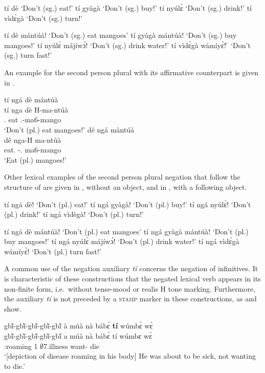 \ea\label{NEGIMPSG}
\ea  tí dè `Don't (sg.) eat!'
\ex tí gyàgà `Don't (sg.) buy!'
\ex tí nyúlɛ̀ `Don't (sg.) drink!' 
\ex tí vìdɛ̀gà `Don't (sg.) turn!' 
\z
\z

\ea\label{NEGIMPSGOBJ}
\ea  tí dè mántúà!  `Don't (sg.) eat mangoes'
\ex tí gyàgà mántúà!  `Don't (sg.) buy mangoes!'
\ex tí nyúlɛ̀ májíwɔ́!  `Don't (sg.) drink water!'
\ex tí vìdɛ̀gà wámíyɛ̀! ̀ `Don't (sg.) turn fast!' 
\z
\z

An example for the second person plural with its affirmative counterpart is given in .

\ea\label{ti4}
\ea \label{ti4a}
  \glll   tí ngá dè mántúà \\
          tí nga dè H-ma-ntúà  \\
         {\NEG}.{\R} {\PL} eat {\OBJ}.{\LINK}-ma6-mango\\
    \trans `Don't (pl.) eat mangoes!'
\ex\label{ti4b}
  \glll   dê ngá màntúà \\
          dê nga-H ma-ntúà  \\
         eat.{\IMP} {\PL}-{\OBJ}.{\LINK} ma6-mango\\
    \trans `Eat (pl.) mangoes!'
\z
\z

Other lexical examples of the second person plural negation that follow the structure of  are given in , without an object, and in , with a following object.


\ea\label{NEGIMPPL}
\ea  tí ngá dè! `Don't (pl.) eat!'
\ex tí ngá gyàgà! `Don't (pl.) buy!'
\ex tí ngá nyúlɛ̀! `Don't (pl.) drink!' 
\ex tí ngá vìdègà! `Don't (pl.) turn!' 
\z
\z


\ea\label{NEGIMPPLOBJ}
\ea  tí ngá dè mántúà!  `Don't (pl.) eat mangoes'
\ex tí ngá gyàgà mántúà!  `Don't (pl.) buy mangoes!'
\ex tí ngá nyúlɛ̀ májíwɔ́!  `Don't (pl.) drink water!'
\ex tí ngá vìdɛ̀gà wámíyɛ̀!  `Don't (pl.) turn fast!' 
\z
\z









A common use of the negation auxiliary {\itshape tí} concerns the negation of infinitives. It is characteristic of these constructions that the negated lexical verb appears in its non-finite form, i.e.\ without tense-mood or realis H tone marking. Furthermore, the auxiliary {\itshape tí} is not preceded by a \textsc{stamp} marker in these constructions, as  and  show.

\ea\label{NEGinf1}
  \glll  gbĩ́-gbĩ̀-gbĩ́-gbĩ̀-gbĩ́  à múà nà bábɛ̀ {\bfseries tí} wúmbɛ̀ wɛ̀\\
            gbĩ́-gbĩ̀-gbĩ́-gbĩ̀-gbĩ́  a múà nà bábɛ̀ tí wúmbɛ wɛ̀\\
         {\IDEO}:roaming 1 {\PROSP} {\COM} $\emptyset$7.illness {\NEG} want-{\R} die\\
    \trans `[depiction of disease roaming in his body] He was about to be sick, not wanting to die.'
\z

